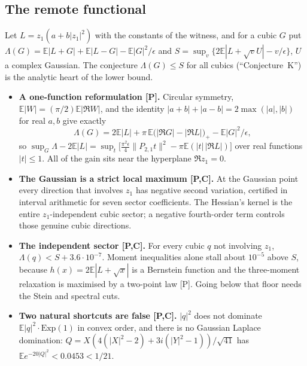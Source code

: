 \documentclass[11pt,a4paper]{article}
\newcommand{\E}{\mathbb{E}}
\begin{document}
\subsection{The remote functional}
Let $L=z_1(a+b|z_1|^2)$ with the constants of the witness, and for a cubic $G$ put
$\Lambda(G)=\E|L+G|+\E|L-G|-\E|G|^2/\epsilon$ and $S=\sup_v\{2\E|L+\sqrt vU|-v/\epsilon\}$, $U$ a complex Gaussian. The
conjecture $\Lambda(G)\le S$ for all cubics (``Conjecture~K'') is the analytic heart of the lower bound.
\begin{itemize}
\item \textbf{A one-function reformulation [P].} Circular symmetry, $\E|W|=(\pi/2)\E|\Re W|$, and the identity $|a+b|+|a-b|=2\max(|a|,|b|)$ for real $a,b$ give exactly
 \[
  \Lambda(G)=2\E|L|+\pi\,\E\bigl(|\Re G|-|\Re L|\bigr)_+-\E|G|^2/\epsilon,
 \]
 so $\sup_G\Lambda-2\E|L|=\sup_t\bigl[\tfrac{\pi^2\epsilon}{4}\|P_{2,1}t\|^2-\pi\E(|t|\,|\Re L|)\bigr]$ over real functions
 $|t|\le1$. All of the gain sits near the hyperplane $\Re z_1=0$.
\item \textbf{The Gaussian is a strict local maximum [P,C].} At the Gaussian point every direction that involves $z_1$ has
 negative second variation, certified in interval arithmetic for seven sector coefficients. The Hessian's kernel is the
 entire $z_1$-independent cubic sector; a negative fourth-order term controls those genuine cubic directions.
\item \textbf{The independent sector [P,C].} For every cubic $q$ not involving $z_1$, $\Lambda(q)<S+3.6\cdot10^{-7}$. Moment
 inequalities alone stall about $10^{-5}$ above $S$, because $h(x)=2\E|L+\sqrt x|$ is a Bernstein function and the
 three-moment relaxation is maximised by a two-point law [P]. Going below that floor needs the Stein and spectral cuts.
\item \textbf{Two natural shortcuts are false [P,C].} $|q|^2$ does not dominate $\E|q|^2\cdot\mathrm{Exp}(1)$ in convex order,
 and there is no Gaussian Laplace domination: $Q=X(4(|X|^2-2)+3i(|Y|^2-1))/\sqrt{41}$ has $\E e^{-20|Q|^2}<0.0453<1/21$.
\end{itemize}
\end{document}

